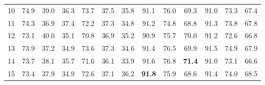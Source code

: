 \begin{table}[t]
{\begin{tabular}{c c c c| c c c| c c c| c c c}
            10 & 74.9 & 39.0 & 36.3 & 73.7 & 37.5 & 35.8 & 91.1 & 76.0 & 69.3 & 91.0 & 73.3 & 67.4 \\
            11 & 74.3 & 36.9 & 37.4 & 72.2 & 37.3 & 34.8 & 91.2 & 74.8 & 68.8 & 91.3 & 73.8 & 67.8 \\
            12 & 73.1 & 40.0 & 35.1 & 70.8 & 36.9 & 35.2 & 90.9 & 75.7 & 70.0 & 91.2 & 72.6 & 66.8 \\
            13 & 73.9 & 37.2 & 34.9 & 73.6 & 37.3 & 34.6 & 91.4 & 76.5 & 69.9 & 91.5 & 74.9 & 67.9 \\
            14 & 73.7 & 38.1 & 35.7 & 71.6 & 36.1 & 33.9 & 91.6 & 76.8 & \textbf{71.4} & 91.0 & 73.1 & 66.6 \\
            15 & 73.4 & 37.9 & 34.9 & 72.6 & 37.1 & 36.2 & \textbf{91.8} & 75.9 & 68.6 & 91.4 & 74.0 & 68.5 \\
                                  
        \bottomrule
    \end{tabular}
    }
    \label{tab:fine_tuning_all}
\end{table}

